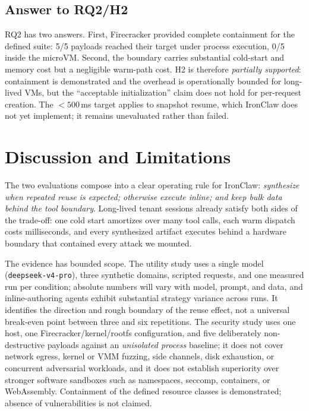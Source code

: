 \documentclass[conference]{IEEEtran}
\newcommand{\toolname}{IronClaw}
\begin{document}
\subsection{Answer to RQ2/H2}
RQ2 has two answers. First, Firecracker provided complete containment for the
defined suite: 5/5 payloads reached their target under process execution, 0/5
inside the microVM. Second, the boundary carries substantial cold-start and
memory cost but a negligible warm-path cost. H2 is therefore \emph{partially
supported}: containment is demonstrated and the overhead is operationally
bounded for long-lived VMs, but the ``acceptable initialization'' claim does
not hold for per-request creation. The ${<}500$\,ms target applies to snapshot
resume, which \toolname{} does not yet implement; it remains unevaluated rather
than failed.

\section{Discussion and Limitations}
\label{sec:discussion}

The two evaluations compose into a clear operating rule for \toolname{}:
\emph{synthesize when repeated reuse is expected; otherwise execute inline;
and keep bulk data behind the tool boundary}. Long-lived tenant sessions
already satisfy both sides of the trade-off: one cold start amortizes over many
tool calls, each warm dispatch costs milliseconds, and every synthesized
artifact executes behind a hardware boundary that contained every attack we
mounted.

The evidence has bounded scope. The utility study uses a single model
(\texttt{deepseek-v4-pro}), three synthetic domains, scripted requests, and one
measured run per condition; absolute numbers will vary with model, prompt, and
data, and inline-authoring agents exhibit substantial strategy variance across
runs. It identifies the direction and rough boundary of the reuse effect, not a
universal break-even point between three and six repetitions. The security
study uses one host, one Firecracker/kernel/rootfs configuration, and five
deliberately non-destructive payloads against an \emph{unisolated process}
baseline; it does not cover network egress, kernel or VMM fuzzing, side
channels, disk exhaustion, or concurrent adversarial workloads, and it does not
establish superiority over stronger software sandboxes such as namespaces,
seccomp, containers, or WebAssembly. Containment of the defined resource
classes is demonstrated; absence of vulnerabilities is not claimed.
\end{document}
